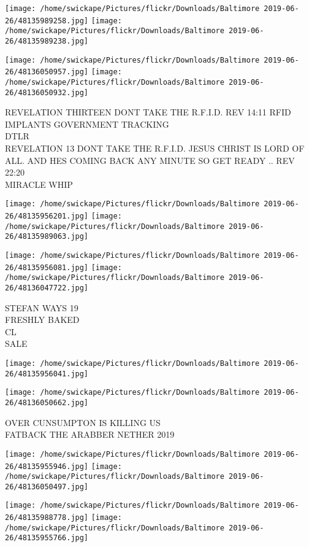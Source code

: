 \documentclass[10pt,letterpaper]{article}
\begin{document}
\texttt{[image: /home/swickape/Pictures/flickr/Downloads/Baltimore 2019-06-26/48135989258.jpg]}
\texttt{[image: /home/swickape/Pictures/flickr/Downloads/Baltimore 2019-06-26/48135989238.jpg]}

\texttt{[image: /home/swickape/Pictures/flickr/Downloads/Baltimore 2019-06-26/48136050957.jpg]}
\texttt{[image: /home/swickape/Pictures/flickr/Downloads/Baltimore 2019-06-26/48136050932.jpg]}

REVELATION THIRTEEN DONT TAKE THE R.F.I.D. REV 14:11 RFID IMPLANTS GOVERNMENT TRACKING\\
DTLR\\
REVELATION 13 DONT TAKE THE R.F.I.D. JESUS CHRIST IS LORD OF ALL.  AND HES COMING BACK ANY MINUTE SO GET READY .. REV 22:20\\
MIRACLE WHIP
\pagebreak

\texttt{[image: /home/swickape/Pictures/flickr/Downloads/Baltimore 2019-06-26/48135956201.jpg]}
\texttt{[image: /home/swickape/Pictures/flickr/Downloads/Baltimore 2019-06-26/48135989063.jpg]}

\texttt{[image: /home/swickape/Pictures/flickr/Downloads/Baltimore 2019-06-26/48135956081.jpg]}
\texttt{[image: /home/swickape/Pictures/flickr/Downloads/Baltimore 2019-06-26/48136047722.jpg]}

STEFAN WAYS 19\\
FRESHLY BAKED\\
CL\\
SALE
\pagebreak

\texttt{[image: /home/swickape/Pictures/flickr/Downloads/Baltimore 2019-06-26/48135956041.jpg]}

\vspace{0.25in}
\texttt{[image: /home/swickape/Pictures/flickr/Downloads/Baltimore 2019-06-26/48136050662.jpg]}

OVER CUNSUMPTON IS KILLING US\\
FATBACK THE ARABBER NETHER 2019
\pagebreak

\texttt{[image: /home/swickape/Pictures/flickr/Downloads/Baltimore 2019-06-26/48135955946.jpg]}
\texttt{[image: /home/swickape/Pictures/flickr/Downloads/Baltimore 2019-06-26/48136050497.jpg]}

\texttt{[image: /home/swickape/Pictures/flickr/Downloads/Baltimore 2019-06-26/48135988778.jpg]}
\texttt{[image: /home/swickape/Pictures/flickr/Downloads/Baltimore 2019-06-26/48135955766.jpg]}
\end{document}
